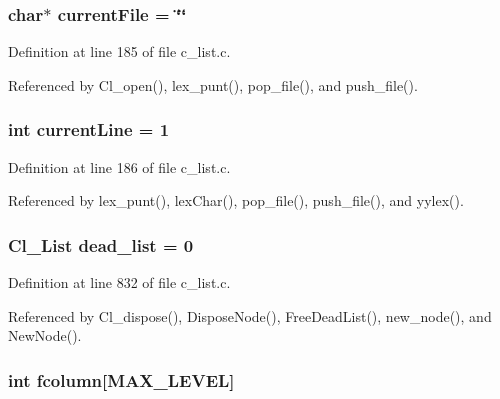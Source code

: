 \subsubsection{\setlength{\rightskip}{0pt plus 5cm}char$\ast$ \bf{current\-File} = \char`\"{}\char`\"{}\hspace{0.3cm}{\tt  [static]}}\label{c__list_8c_58dda836073e3970300397e2a5a9bd9e}




Definition at line 185 of file c\_\-list.c.

Referenced by Cl\_\-open(), lex\_\-punt(), pop\_\-file(), and push\_\-file().
\subsubsection{\setlength{\rightskip}{0pt plus 5cm}int \bf{current\-Line} = 1\hspace{0.3cm}{\tt  [static]}}\label{c__list_8c_163792de4399a947d8e9d3bb15f7af41}




Definition at line 186 of file c\_\-list.c.

Referenced by lex\_\-punt(), lex\-Char(), pop\_\-file(), push\_\-file(), and yylex().
\subsubsection{\setlength{\rightskip}{0pt plus 5cm}\bf{Cl\_\-List} \bf{dead\_\-list} = 0\hspace{0.3cm}{\tt  [static]}}\label{c__list_8c_df5f7c87604a9888c0e6f876593235ff}




Definition at line 832 of file c\_\-list.c.

Referenced by Cl\_\-dispose(), Dispose\-Node(), Free\-Dead\-List(), new\_\-node(), and New\-Node().
\subsubsection{\setlength{\rightskip}{0pt plus 5cm}int \bf{fcolumn}[MAX\_\-LEVEL]\hspace{0.3cm}{\tt  [static]}}\label{c__list_8c_e6f7397259b3140abd2215d398cd8231}




